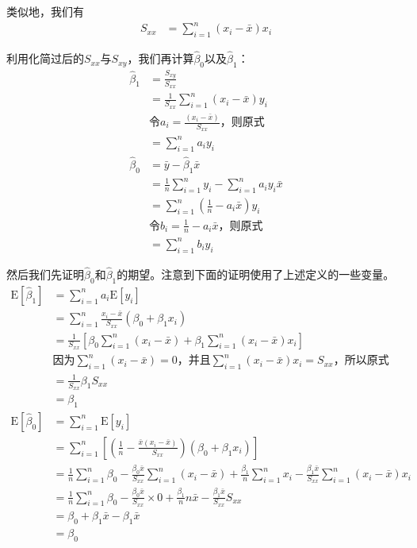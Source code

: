 \documentclass[UTF8]{ctexart}
\begin{document}
类似地，我们有
\begin{align*}
	S_{xx}&=\sum_{i=1}^n(x_i-\bar x)x_i
\end{align*}

利用化简过后的$S_{xx}$与$S_{xy}$，我们再计算$\hat\beta_0$以及$\hat\beta_1$：
\begin{align*}
	\hat\beta_1&=\frac{S_{xy}}{S_{xx}}\\
	&=\frac{1}{S_{xx}}\sum_{i=1}^n(x_i-\bar x)y_i\\
	&\text{令$a_i=\frac{(x_i-\bar x)}{S_{xx}}$，则原式}\\
	&=\sum_{i=1}^na_iy_i\\
	\hat\beta_0&=\bar y-\hat\beta_1\bar x\\
	&=\frac{1}{n}\sum_{i=1}^ny_i-\sum_{i=1}^na_iy_i\bar x\\
	&=\sum_{i=1}^n(\frac{1}{n}-a_i\bar x)y_i\\
	&\text{令$b_i=\frac{1}{n}-a_i\bar x$，则原式}\\
	&=\sum_{i=1}^nb_iy_i
\end{align*}

然后我们先证明$\hat\beta_0$和$\hat\beta_1$的期望。注意到下面的证明使用了上述定义的一些变量。
\begin{align*}
	\mathrm E[\hat\beta_1]&=\sum_{i=1}^na_i\mathrm E[y_i]\\
	&=\sum_{i=1}^n\frac{x_i-\bar x}{S_{xx}}(\beta_0+\beta_1x_i)\\
	&=\frac{1}{S_{xx}}[\beta_0\sum_{i=1}^n(x_i-\bar x)+\beta_1\sum_{i=1}^n(x_i-\bar x)x_i]\\
	&\text{因为$\sum_{i=1}^n(x_i-\bar x)=0$，并且$\sum_{i=1}^n(x_i-\bar x)x_i=S_{xx}$，所以原式}\\
	&=\frac{1}{S_{xx}}\beta_1S_{xx}\\
	&=\beta_1\\
	\mathrm E[\hat\beta_0]&=\sum_{i=1}^n\mathrm E[y_i]\\
	&=\sum_{i=1}^n\left[\left(\frac{1}{n}-\frac{\bar x(x_i-\bar x)}{S_{xx}}\right)(\beta_0+\beta_1x_i)\right]\\
	&=\frac{1}{n}\sum_{i=1}^n\beta_0-\frac{\beta_0\bar x}{S_{xx}}\sum_{i=1}^n(x_i-\bar x)+\frac{\beta_1}{n}\sum_{i=1}^nx_i-\frac{\beta_1\bar x}{S_{xx}}\sum_{i=1}^n(x_i-\bar x)x_i\\
	&=\frac{1}{n}\sum_{i=1}^n\beta_0-\frac{\beta_0\bar x}{S_{xx}}\times 0+\frac{\beta_1}{n}n\bar x-\frac{\beta_1\bar x}{S_{xx}}S_{xx}\\
	&=\beta_0+\beta_1\bar x-\beta_1\bar x\\
	&=\beta_0
\end{align*}
\end{document}
